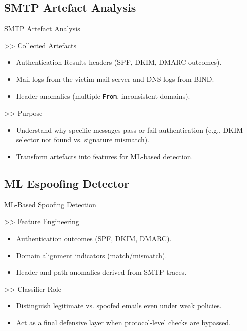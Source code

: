 \documentclass[aspectratio=169,10pt]{beamer}
\begin{document}
\subsection{SMTP Artefact Analysis}
\begin{frame}{SMTP Artefact Analysis}
  \transdissolve
  \begin{block}{>> Collected Artefacts}
  \begin{itemize}
    \item Authentication-Results headers (SPF, DKIM, DMARC outcomes).
    \item Mail logs from the victim mail server and DNS logs from BIND.
    \item Header anomalies (multiple \texttt{From}, inconsistent domains).
  \end{itemize}
  \end{block}
  \vfill
  \begin{block}{>> Purpose}
  \begin{itemize}
    \item Understand why specific messages pass or fail authentication
          (e.g., DKIM selector not found vs. signature mismatch).
    \item Transform artefacts into features for ML-based detection.
  \end{itemize}
  \end{block}
\end{frame}

\subsection{ML Espoofing Detector}
\begin{frame}{ML-Based Spoofing Detection}
  \transdissolve
  \begin{block}{>> Feature Engineering}
  \begin{itemize}
    \item Authentication outcomes (SPF, DKIM, DMARC).
    \item Domain alignment indicators (match/mismatch).
    \item Header and path anomalies derived from SMTP traces.
  \end{itemize}
  \end{block}
  \vfill
  \begin{block}{>> Classifier Role}
  \begin{itemize}
    \item Distinguish legitimate vs. spoofed emails even under weak policies.
    \item Act as a final defensive layer when protocol-level checks are bypassed.
  \end{itemize}
  \end{block}
\end{frame}
\end{document}
